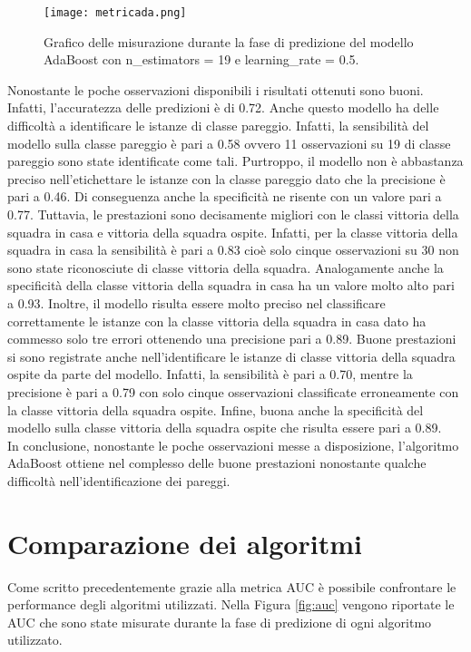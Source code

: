 \begin{figure}[]
	\begin{center}
		\texttt{[image: metricada.png]}
		\caption{Grafico delle misurazione durante la fase di predizione del modello AdaBoost con \textsf{n\_estimators} = 19 e \textsf{learning\_rate} = 0.5.
		} 
		\label{fig:adametrics}
	\end{center}
\end{figure}
Nonostante le poche osservazioni disponibili i risultati ottenuti sono buoni. Infatti, l'accuratezza delle predizioni è di 0.72. Anche questo modello ha delle difficoltà a identificare le istanze di classe pareggio. Infatti, la sensibilità del modello sulla classe pareggio è pari a 0.58 ovvero 11 osservazioni su 19 di classe pareggio sono state identificate come tali. Purtroppo, il modello non è abbastanza preciso nell’etichettare le istanze con la classe pareggio dato che la precisione è pari a 0.46. Di conseguenza anche la specificità ne risente con un valore pari a 0.77. Tuttavia, le prestazioni sono decisamente migliori con le classi vittoria della squadra in casa e vittoria della squadra ospite. Infatti, per la classe vittoria della squadra in casa la sensibilità è pari a 0.83 cioè solo cinque osservazioni su 30 non sono state riconosciute di classe vittoria della squadra. Analogamente anche la specificità della classe vittoria della squadra in casa ha un valore molto alto pari a 0.93. Inoltre, il modello risulta essere molto preciso nel classificare correttamente le istanze con la classe vittoria della squadra in casa dato ha commesso solo tre errori ottenendo una precisione pari a 0.89. Buone prestazioni si sono registrate anche nell'identificare le istanze di classe vittoria della squadra ospite da parte del modello. Infatti, la sensibilità è pari a 0.70, mentre la precisione è pari a 0.79 con solo cinque osservazioni classificate erroneamente con la classe vittoria della squadra ospite. Infine, buona anche la specificità del modello sulla classe vittoria della squadra ospite che risulta essere pari a 0.89.\\
In conclusione, nonostante le poche osservazioni messe a disposizione, l'algoritmo AdaBoost ottiene nel complesso delle buone prestazioni nonostante qualche difficoltà nell’identificazione dei pareggi.

\section{Comparazione dei algoritmi}
Come scritto precedentemente grazie alla metrica AUC è possibile confrontare le performance degli algoritmi utilizzati. 
Nella Figura \ref{fig:auc} vengono riportate le AUC che sono state misurate durante la fase di predizione di ogni algoritmo utilizzato.

